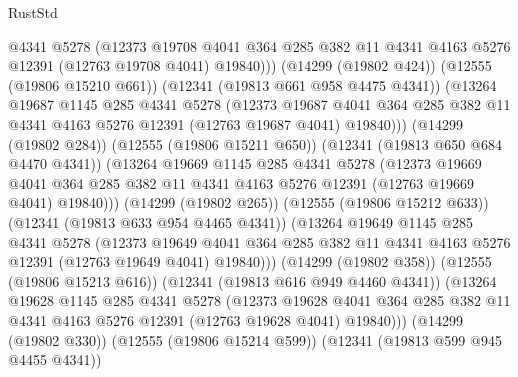 \begin{lexlean}{RustStd}
\begin{coremodule}
                  @4341
                  @5278
                  (@12373
                    @19708
                    @4041
                    @364
                    @285
                    @382
                    @11
                    @4341
                    @4163
                    @5276
                    @12391
                    (@12763 @19708 @4041)
                    @19840)))
              (@14299 (@19802 @424))
              (@12555 (@19806 @15210 @661))
              (@12341 (@19813 @661 @958 @4475 @4341))
              (@13264
                @19687
                @1145
                @285
                @4341
                @5278
                (@12373
                  @19687
                  @4041
                  @364
                  @285
                  @382
                  @11
                  @4341
                  @4163
                  @5276
                  @12391
                  (@12763 @19687 @4041)
                  @19840)))
            (@14299 (@19802 @284))
            (@12555 (@19806 @15211 @650))
            (@12341 (@19813 @650 @684 @4470 @4341))
            (@13264
              @19669
              @1145
              @285
              @4341
              @5278
              (@12373
                @19669
                @4041
                @364
                @285
                @382
                @11
                @4341
                @4163
                @5276
                @12391
                (@12763 @19669 @4041)
                @19840)))
          (@14299 (@19802 @265))
          (@12555 (@19806 @15212 @633))
          (@12341 (@19813 @633 @954 @4465 @4341))
          (@13264
            @19649
            @1145
            @285
            @4341
            @5278
            (@12373
              @19649
              @4041
              @364
              @285
              @382
              @11
              @4341
              @4163
              @5276
              @12391
              (@12763 @19649 @4041)
              @19840)))
        (@14299 (@19802 @358))
        (@12555 (@19806 @15213 @616))
        (@12341 (@19813 @616 @949 @4460 @4341))
        (@13264
          @19628
          @1145
          @285
          @4341
          @5278
          (@12373
            @19628
            @4041
            @364
            @285
            @382
            @11
            @4341
            @4163
            @5276
            @12391
            (@12763 @19628 @4041)
            @19840)))
      (@14299 (@19802 @330))
      (@12555 (@19806 @15214 @599))
      (@12341 (@19813 @599 @945 @4455 @4341))

\end{coremodule}
\end{lexlean}
